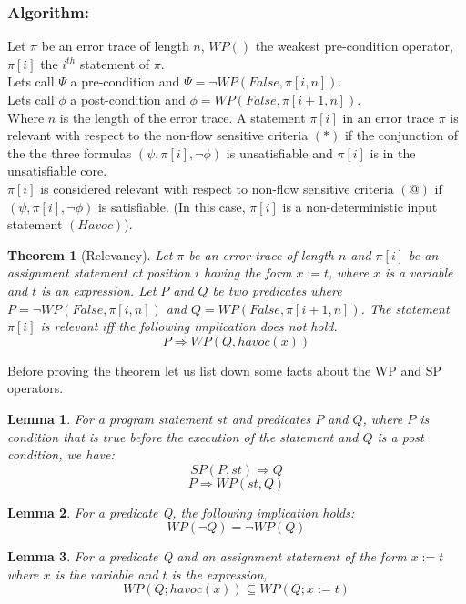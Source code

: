 \documentclass{article}
\newtheorem{theorem}{Theorem}
\newtheorem{lemma}{Lemma}
\begin{document}
\subsubsection{Algorithm:}
Let $\pi$ be an error trace of length $n$, $WP()$ the weakest pre-condition operator, $\pi[i]$ the $i^{th}$ statement of $\pi$.\\
Lets call $\Psi$ a pre-condition and $\Psi = \neg WP(False, \pi[i,n])$.\\
Lets call $\phi$ a post-condition and $\phi =  WP(False, \pi[i+1,n])$.\\
 Where $n$ is the length of the error trace.
A statement $\pi[i]$ in an error trace $\pi$ is relevant with respect to the non-flow sensitive criteria $(*)$ if the conjunction of the the three formulas $(\psi,\pi[i],\neg \phi) $ is unsatisfiable and $\pi[i]$ is in the unsatisfiable core.\\
$\pi[i]$ is considered relevant with respect to non-flow sensitive criteria $(@)$ if  $(\psi,\pi[i],\neg \phi) $ is satisfiable. (In this case, $\pi[i]$ is a non-deterministic input statement $(Havoc)$).\\
\begin{theorem}[Relevancy]
Let $\pi$ be an error trace of length $n$ and $\pi[i]$ be an assignment statement at position $i$ having the form $x:=t$, where $x$ is a variable and $t$ is an expression. Let $P$ and $Q$ be two predicates where $P = \neg WP(False, \pi[i,n])$ and $Q =  WP(False, \pi[i+1,n])$. The statement $\pi[i]$ is relevant iff the following implication does not hold.
 $$P \Rightarrow WP(Q,havoc(x))$$
\end{theorem}
Before proving the theorem let us list down some facts about the WP and SP operators.\\
\begin{lemma}
For a program statement $st$ and predicates $P$ and $Q$, where $P$ is condition that is true before the execution of the statement and $Q$ is a post condition, we have:
$$SP(P,st) \Rightarrow Q$$
$$P \Rightarrow WP(st,Q)$$
\end{lemma}

\begin{lemma}
For a predicate Q, the following implication holds:\\
$$WP(\neg Q) = \neg WP(Q)$$
\end{lemma}

\begin{lemma}
For a predicate Q and an assignment statement of the form $x:=t$ where $x$ is the variable and $t$ is the expression, 
$$WP(Q;havoc(x)) \subseteq WP(Q; x:=t)$$
\end{lemma}
\end{document}
